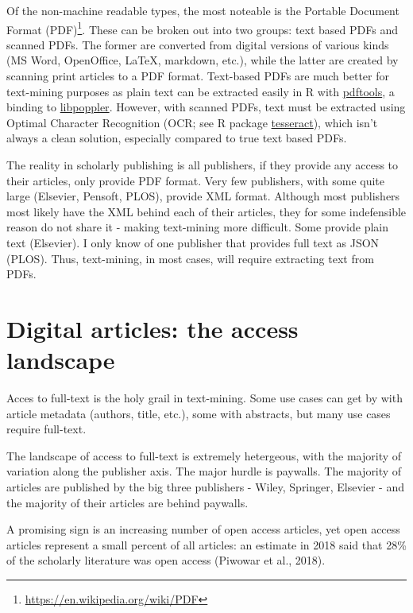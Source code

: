 \documentclass[author-year, review, 11pt]{components/elsarticle} %
\begin{document}
Of the non-machine readable types, the most noteable is the Portable
Document Format (PDF)\footnote{\url{https://en.wikipedia.org/wiki/PDF}}.
These can be broken out into two groups: text based PDFs and scanned
PDFs. The former are converted from digital versions of various kinds
(MS Word, OpenOffice, LaTeX, markdown, etc.), while the latter are
created by scanning print articles to a PDF format. Text-based PDFs are
much better for text-mining purposes as plain text can be extracted
easily in R with \href{https://github.com/ropensci/pdftools}{pdftools},
a binding to \href{https://poppler.freedesktop.org/}{libpoppler}.
However, with scanned PDFs, text must be extracted using Optimal
Character Recognition (OCR; see R package
\href{https://github.com/ropensci/tesseract}{tesseract}), which isn't
always a clean solution, especially compared to true text based PDFs.

The reality in scholarly publishing is all publishers, if they provide
any access to their articles, only provide PDF format. Very few
publishers, with some quite large (Elsevier, Pensoft, PLOS), provide XML
format. Although most publishers most likely have the XML behind each of
their articles, they for some indefensible reason do not share it -
making text-mining more difficult. Some provide plain text (Elsevier). I
only know of one publisher that provides full text as JSON (PLOS). Thus,
text-mining, in most cases, will require extracting text from PDFs.

\hypertarget{digital-articles-the-access-landscape}{%
\section{Digital articles: the access
landscape}\label{digital-articles-the-access-landscape}}

Acces to full-text is the holy grail in text-mining. Some use cases can
get by with article metadata (authors, title, etc.), some with
abstracts, but many use cases require full-text.

The landscape of access to full-text is extremely hetergeous, with the
majority of variation along the publisher axis. The major hurdle is
paywalls. The majority of articles are published by the big three
publishers - Wiley, Springer, Elsevier - and the majority of their
articles are behind paywalls.

A promising sign is an increasing number of open access articles, yet
open access articles represent a small percent of all articles: an
estimate in 2018 said that 28\% of the scholarly literature was open
access (Piwowar et al., 2018).
\end{document}
